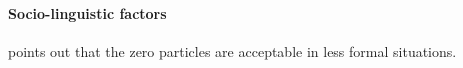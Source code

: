 \paragraph{Socio-linguistic factors}

 points out that the zero particles are acceptable
in less formal situations.
%

